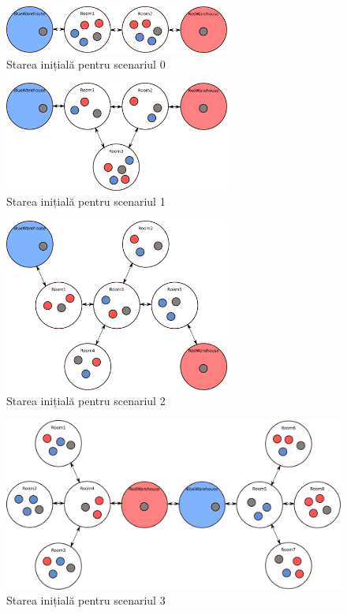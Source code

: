 \documentclass[12pt]{article}
\begin{document}
\begin{figure}[h!]
  \centering
  \includegraphics[width=0.66\textwidth]{graphics/scenario0.pdf}
  \caption{Starea inițială pentru scenariul 0}
  \label{fig:s0}
\end{figure}

\begin{figure}[h!]
  \centering
  \includegraphics[width=0.66\textwidth]{graphics/scenario1.pdf}
  \caption{Starea inițială pentru scenariul 1}
  \label{fig:s1}
\end{figure}

\begin{figure}[h!]
  \centering
  \includegraphics[width=0.66\textwidth]{graphics/scenario2.pdf}
  \caption{Starea inițială pentru scenariul 2}
  \label{fig:s2}
\end{figure}


\begin{figure}[h!]
  \centering
  \includegraphics[width=\textwidth]{graphics/scenario3.pdf}
  \caption{Starea inițială pentru scenariul 3}
  \label{fig:s3}
\end{figure}
\end{document}
